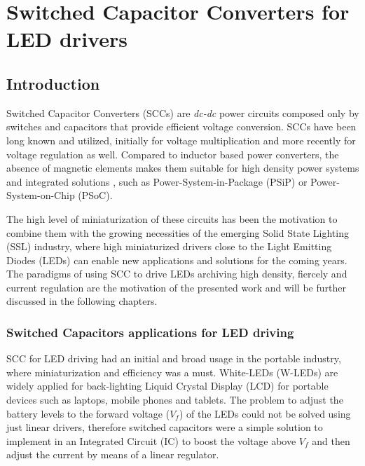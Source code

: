 \part[SCC for LED drivers]{Switched Capacitor Converters for LED drivers}
\label{ch:h_scc}

\chapter{Introduction}
Switched Capacitor Converters (SCCs) are \emph{dc-dc} power circuits composed only by switches and capacitors that provide efficient voltage conversion. SCCs have been long known and utilized, initially for voltage multiplication and more recently for voltage regulation as well. Compared to inductor based power converters, the absence of magnetic elements makes them suitable for high density power systems and integrated solutions , such as Power-System-in-Package (PSiP) or Power-System-on-Chip (PSoC).


The high level of miniaturization of these circuits has been the motivation to combine them with the growing necessities of the emerging Solid State Lighting (SSL) industry, where high miniaturized drivers close to the Light Emitting Diodes (LEDs) can enable new applications and solutions for the coming years. The paradigms of using SCC  to drive LEDs archiving high density, fiercely and current regulation are the motivation of the presented work and will be further discussed in the following chapters.
\\

\section{Switched Capacitors applications for LED driving}

SCC for LED driving had an initial and  broad usage in the portable industry, where miniaturization and efficiency was a must. White-LEDs (W-LEDs) are widely applied for back-lighting Liquid Crystal Display (LCD) for portable devices such as laptops, mobile phones and tablets. The problem to adjust the battery levels to the forward voltage ($V_f$) of the LEDs could not be solved using just linear drivers, therefore switched capacitors were a simple solution to implement in an Integrated Circuit (IC) to boost the voltage above $V_f$ and then adjust the current by means of a linear regulator.

